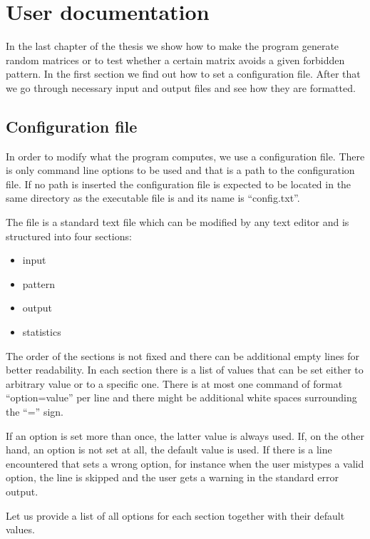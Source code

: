 \chapter{User documentation}
In the last chapter of the thesis we show how to make the program generate random matrices or to test whether a certain matrix avoids a given forbidden pattern. In the first section we find out how to set a configuration file. After that we go through necessary input and output files and see how they are formatted.

\section{Configuration file}

In order to modify what the program computes, we use a configuration file. There is only command line options to be used and that is a path to the configuration file. If no path is inserted the configuration file is expected to be located in the same directory as the executable file is and its name is ``config.txt''.

The file is a standard text file which can be modified by any text editor and is structured into four sections:
\begin{itemize}
\item input
\item pattern
\item output
\item statistics
\end{itemize}
The order of the sections is not fixed and there can be additional empty lines for better readability. In each section there is a list of values that can be set either to arbitrary value or to a specific one. There is at most one command of format ``option=value'' per line and there might be additional white spaces surrounding the ``='' sign.

If an option is set more than once, the latter value is always used. If, on the other hand, an option is not set at all, the default value is used. If there is a line encountered that sets a wrong option, for instance when the user mistypes a valid option, the line is skipped and the user gets a warning in the standard error output.

Let us provide a list of all options for each section together with their default values.

